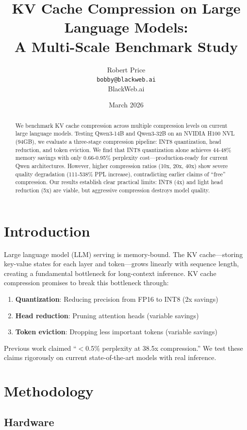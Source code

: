 \documentclass[11pt]{article}
\title{KV Cache Compression on Large Language Models: \\
A Multi-Scale Benchmark Study}
\author{Robert Price\\
\texttt{bobby@blackweb.ai}\\
BlackWeb.ai}
\date{March 2026}
\begin{document}
\maketitle

\begin{abstract}
We benchmark KV cache compression across multiple compression levels on current large language models. Testing Qwen3-14B and Qwen3-32B on an NVIDIA H100 NVL (94GB), we evaluate a three-stage compression pipeline: INT8 quantization, head reduction, and token eviction. We find that INT8 quantization alone achieves 44-48\% memory savings with only 0.66-0.95\% perplexity cost—production-ready for current Qwen architectures. However, higher compression ratios (10x, 20x, 40x) show severe quality degradation (111-538\% PPL increase), contradicting earlier claims of ``free'' compression. Our results establish clear practical limits: INT8 (4x) and light head reduction (5x) are viable, but aggressive compression destroys model quality.
\end{abstract}

\section{Introduction}

Large language model (LLM) serving is memory-bound. The KV cache—storing key-value states for each layer and token—grows linearly with sequence length, creating a fundamental bottleneck for long-context inference. KV cache compression promises to break this bottleneck through:

\begin{enumerate}
    \item \textbf{Quantization}: Reducing precision from FP16 to INT8 (2x savings)
    \item \textbf{Head reduction}: Pruning attention heads (variable savings)
    \item \textbf{Token eviction}: Dropping less important tokens (variable savings)
\end{enumerate}

Previous work claimed ``$<$0.5\% perplexity at 38.5x compression.'' We test these claims rigorously on current state-of-the-art models with real inference.

\section{Methodology}

\subsection{Hardware}
\end{document}
